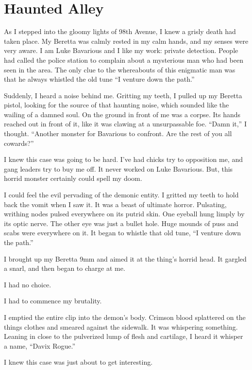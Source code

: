 \chapter{Haunted Alley}

As I stepped into the gloomy lights of 98th Avenue, I knew a grisly
death had taken place. My Beretta was calmly rested in my calm hands,
and my senses were very aware. I am Luke Bavarious and I like my work:
private detection. People had called the police station to complain
about a mysterious man who had been seen in the area. The only clue to
the whereabouts of this enigmatic man was that he always whistled the
old tune ``I venture down the path.''

Suddenly, I heard a noise behind me. Gritting my teeth, I pulled up my
Beretta pistol, looking for the source of that haunting noise, which
sounded like the wailing of a damned soul. On the ground in front of me
was a corpse. Its hands reached out in front of it, like it was clawing
at a unsurpassable foe. ``Damn it,'' I thought. ``Another monster for
Bavarious to confront. Are the rest of you all cowards?''

I knew this case was going to be hard. I've had chicks try to opposition
me, and gang leaders try to buy me off. It never worked on Luke
Bavarious. But, this horrid monster certainly could spell my doom.

I could feel the evil pervading of the demonic entity. I gritted my
teeth to hold back the vomit when I saw it. It was a beast of ultimate
horror. Pulsating, writhing nodes pulsed everywhere on its putrid
skin. One eyeball hung limply by its optic nerve. The other eye was just
a bullet hole. Huge mounds of puss and scabs were everywhere on it. It
began to whistle that old tune, ``I venture down the path.''

I brought up my Beretta 9mm and aimed it at the thing's horrid head. It
gargled a snarl, and then began to charge at me.

I had no choice.

I had to commence my brutality.

I emptied the entire clip into the demon's body. Crimson blood
splattered on the things clothes and smeared against the sidewalk. It
was whispering something. Leaning in close to the pulverized lump of
flesh and cartilage, I heard it whisper a name, ``Davix Rogue.''

I knew this case was just about to get interesting.


